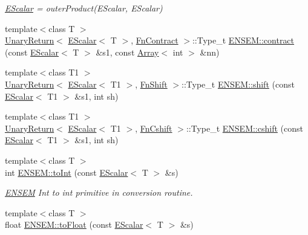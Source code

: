\begin{DoxyCompactItemize}
\begin{DoxyCompactList}\small\item\em \mbox{\hyperlink{classENSEM_1_1EScalar}{E\+Scalar}} = outer\+Product(\+E\+Scalar, E\+Scalar) \end{DoxyCompactList}\item 
{\footnotesize template$<$class T $>$ }\\\mbox{\hyperlink{structENSEM_1_1UnaryReturn}{Unary\+Return}}$<$ \mbox{\hyperlink{classENSEM_1_1EScalar}{E\+Scalar}}$<$ T $>$, \mbox{\hyperlink{structENSEM_1_1FnContract}{Fn\+Contract}} $>$\+::Type\+\_\+t \mbox{\hyperlink{group__escalar_ga6c04652cc005e69e9785effa182a8436}{E\+N\+S\+E\+M\+::contract}} (const \mbox{\hyperlink{classENSEM_1_1EScalar}{E\+Scalar}}$<$ T $>$ \&s1, const \mbox{\hyperlink{classXMLArray_1_1Array}{Array}}$<$ int $>$ \&nn)
\item 
{\footnotesize template$<$class T1 $>$ }\\\mbox{\hyperlink{structENSEM_1_1UnaryReturn}{Unary\+Return}}$<$ \mbox{\hyperlink{classENSEM_1_1EScalar}{E\+Scalar}}$<$ T1 $>$, \mbox{\hyperlink{structENSEM_1_1FnShift}{Fn\+Shift}} $>$\+::Type\+\_\+t \mbox{\hyperlink{group__escalar_gaeaac3a9b82b6d6c8f0ec25efb3242cfe}{E\+N\+S\+E\+M\+::shift}} (const \mbox{\hyperlink{classENSEM_1_1EScalar}{E\+Scalar}}$<$ T1 $>$ \&s1, int sh)
\item 
{\footnotesize template$<$class T1 $>$ }\\\mbox{\hyperlink{structENSEM_1_1UnaryReturn}{Unary\+Return}}$<$ \mbox{\hyperlink{classENSEM_1_1EScalar}{E\+Scalar}}$<$ T1 $>$, \mbox{\hyperlink{structENSEM_1_1FnCshift}{Fn\+Cshift}} $>$\+::Type\+\_\+t \mbox{\hyperlink{group__escalar_ga4a9bfa7287ccf8fef9605aa9e9a44884}{E\+N\+S\+E\+M\+::cshift}} (const \mbox{\hyperlink{classENSEM_1_1EScalar}{E\+Scalar}}$<$ T1 $>$ \&s1, int sh)
\item 
{\footnotesize template$<$class T $>$ }\\int \mbox{\hyperlink{group__escalar_ga332b1b685c28f8bdbf099f3e32016ad2}{E\+N\+S\+E\+M\+::to\+Int}} (const \mbox{\hyperlink{classENSEM_1_1EScalar}{E\+Scalar}}$<$ T $>$ \&s)
\begin{DoxyCompactList}\small\item\em \mbox{\hyperlink{namespaceENSEM}{E\+N\+S\+EM}} Int to int primitive in conversion routine. \end{DoxyCompactList}\item 
{\footnotesize template$<$class T $>$ }\\float \mbox{\hyperlink{group__escalar_gaf21f130175f8bc3a98a90272dc196b2c}{E\+N\+S\+E\+M\+::to\+Float}} (const \mbox{\hyperlink{classENSEM_1_1EScalar}{E\+Scalar}}$<$ T $>$ \&s)

\end{DoxyCompactItemize}
